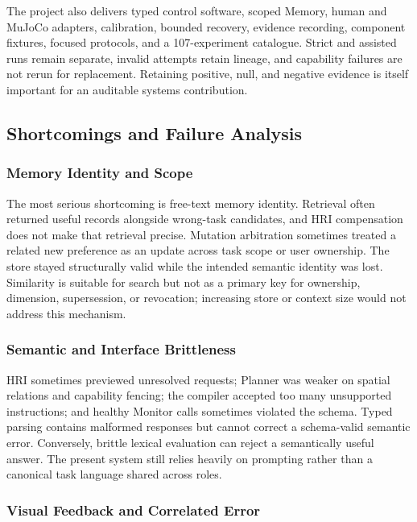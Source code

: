 The project also delivers typed control software, scoped Memory, human and
MuJoCo adapters, calibration, bounded recovery, evidence recording, component
fixtures, focused protocols, and a 107-experiment catalogue. Strict and assisted
runs remain separate, invalid attempts retain lineage, and capability failures
are not rerun for replacement. Retaining positive, null, and negative evidence
is itself important for an auditable systems contribution.

\subsection{Shortcomings and Failure Analysis}
\label{subsec:discussion-shortcomings}

\subsubsection{Memory Identity and Scope}

The most serious shortcoming is free-text memory identity. Retrieval often
returned useful records alongside wrong-task candidates, and HRI compensation
does not make that retrieval precise. Mutation arbitration sometimes treated a
related new preference as an update across task scope or user ownership. The
store stayed structurally valid while the intended semantic identity was lost.
Similarity is suitable for search but not as a primary key for ownership,
dimension, supersession, or revocation; increasing store or context size would
not address this mechanism.

\subsubsection{Semantic and Interface Brittleness}

HRI sometimes previewed unresolved requests; Planner was weaker on spatial
relations and capability fencing; the compiler accepted too many unsupported
instructions; and healthy Monitor calls sometimes violated the schema. Typed
parsing contains malformed responses but cannot correct a schema-valid semantic
error. Conversely, brittle lexical evaluation can reject a semantically useful
answer. The present system still relies heavily on prompting rather than a
canonical task language shared across roles.

\subsubsection{Visual Feedback and Correlated Error}

